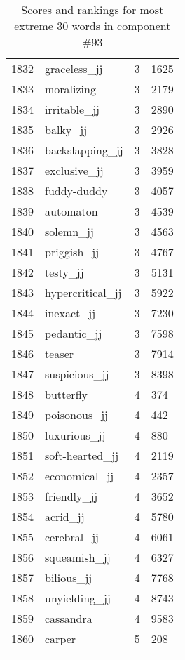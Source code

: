 \begin{longtable}[!htbp]{| rlr@{.}l |}
    1832 & graceless\_jj & 3 & 1625 \\
    1833 & moralizing & 3 & 2179 \\
    1834 & irritable\_jj & 3 & 2890 \\
    1835 & balky\_jj & 3 & 2926 \\
    1836 & backslapping\_jj & 3 & 3828 \\
    1837 & exclusive\_jj & 3 & 3959 \\
    1838 & fuddy-duddy & 3 & 4057 \\
    1839 & automaton & 3 & 4539 \\
    1840 & solemn\_jj & 3 & 4563 \\
    1841 & priggish\_jj & 3 & 4767 \\
    1842 & testy\_jj & 3 & 5131 \\
    1843 & hypercritical\_jj & 3 & 5922 \\
    1844 & inexact\_jj & 3 & 7230 \\
    1845 & pedantic\_jj & 3 & 7598 \\
    1846 & teaser & 3 & 7914 \\
    1847 & suspicious\_jj & 3 & 8398 \\
    1848 & butterfly & 4 & 374 \\
    1849 & poisonous\_jj & 4 & 442 \\
    1850 & luxurious\_jj & 4 & 880 \\
    1851 & soft-hearted\_jj & 4 & 2119 \\
    1852 & economical\_jj & 4 & 2357 \\
    1853 & friendly\_jj & 4 & 3652 \\
    1854 & acrid\_jj & 4 & 5780 \\
    1855 & cerebral\_jj & 4 & 6061 \\
    1856 & squeamish\_jj & 4 & 6327 \\
    1857 & bilious\_jj & 4 & 7768 \\
    1858 & unyielding\_jj & 4 & 8743 \\
    1859 & cassandra & 4 & 9583 \\
    1860 & carper & 5 & 208 \\
    \hline
    \caption{Scores and rankings for most extreme 30 words in component \#93} \\
\end{longtable}
